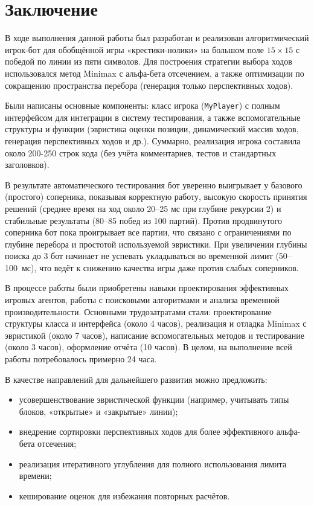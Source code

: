 \section*{Заключение}

В ходе выполнения данной работы был разработан и реализован алгоритмический игрок-бот для обобщённой игры «крестики-нолики» на большом поле $15 \times 15$ с победой по линии из пяти символов. Для построения стратегии выбора ходов использовался метод Minimax с альфа-бета отсечением, а также оптимизации по сокращению пространства перебора (генерация только перспективных ходов).

Были написаны основные компоненты: класс игрока (\texttt{MyPlayer}) с полным интерфейсом для интеграции в систему тестирования, а также вспомогательные структуры и функции (эвристика оценки позиции, динамический массив ходов, генерация перспективных ходов и др.). Суммарно, реализация игрока составила около 200-250 строк кода (без учёта комментариев, тестов и стандартных заголовков).

В результате автоматического тестирования бот уверенно выигрывает у базового (простого) соперника, показывая корректную работу, высокую скорость принятия решений (среднее время на ход около 20--25 мс при глубине рекурсии 2) и стабильные результаты (80--85 побед из 100 партий). Против продвинутого соперника бот пока проигрывает все партии, что связано с ограничениями по глубине перебора и простотой используемой эвристики. При увеличении глубины поиска до 3 бот начинает не успевать укладываться во временной лимит (50--100~мс), что ведёт к снижению качества игры даже против слабых соперников.

В процессе работы были приобретены навыки проектирования эффективных игровых агентов, работы с поисковыми алгоритмами и анализа временной производительности. Основными трудозатратами стали: проектирование структуры класса и интерфейса (около 4 часов), реализация и отладка Minimax с эвристикой (около 7 часов), написание вспомогательных методов и тестирование (около 3 часов), оформление отчёта (10 часов). В целом, на выполнение всей работы потребовалось примерно 24 часа.

В качестве направлений для дальнейшего развития можно предложить:
\begin{itemize}
    \item усовершенствование эвристической функции (например, учитывать типы блоков, «открытые» и «закрытые» линии);
    \item внедрение сортировки перспективных ходов для более эффективного альфа-бета отсечения;
    \item реализация итеративного углубления для полного использования лимита времени;
    \item кеширование оценок для избежания повторных расчётов.
\end{itemize}
